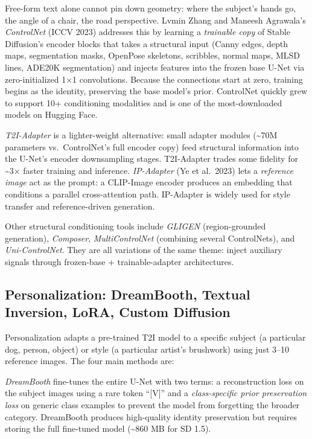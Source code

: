 \documentclass{article}
\begin{document}
Free-form text alone cannot pin down geometry: where the subject's hands go, the angle of a chair, the road perspective. Lvmin Zhang and Maneesh Agrawala's \emph{ControlNet} (ICCV 2023) addresses this by learning a \emph{trainable copy} of Stable Diffusion's encoder blocks that takes a structural input (Canny edges, depth maps, segmentation masks, OpenPose skeletons, scribbles, normal maps, MLSD lines, ADE20K segmentation) and injects features into the frozen base U-Net via zero-initialized 1×1 convolutions. Because the connections start at zero, training begins as the identity, preserving the base model's prior. ControlNet quickly grew to support 10+ conditioning modalities and is one of the most-downloaded models on Hugging Face.

\emph{T2I-Adapter} \citep{mou20242024} is a lighter-weight alternative: small adapter modules (\textasciitilde70M parameters vs.~ControlNet's full encoder copy) feed structural information into the U-Net's encoder downsampling stages. T2I-Adapter trades some fidelity for \textasciitilde3× faster training and inference. \emph{IP-Adapter} (Ye et al.~2023) lets a \emph{reference image} act as the prompt: a CLIP-Image encoder produces an embedding that conditions a parallel cross-attention path. IP-Adapter is widely used for style transfer and reference-driven generation.

Other structural conditioning tools include \emph{GLIGEN} (region-grounded generation), \emph{Composer}, \emph{MultiControlNet} (combining several ControlNets), and \emph{Uni-ControlNet}. They are all variations of the same theme: inject auxiliary signals through frozen-base + trainable-adapter architectures.

\subsection{Personalization: DreamBooth, Textual Inversion, LoRA, Custom Diffusion}\label{personalization-dreambooth-textual-inversion-lora-custom-diffusion}

Personalization adapts a pre-trained T2I model to a specific subject (a particular dog, person, object) or style (a particular artist's brushwork) using just 3--10 reference images. The four main methods are:

\emph{DreamBooth} \citep{ruiz2023dreamboothfinetuni} fine-tunes the entire U-Net with two terms: a reconstruction loss on the subject images using a rare token ``{[}V{]}'' and a \emph{class-specific prior preservation loss} on generic class examples to prevent the model from forgetting the broader category. DreamBooth produces high-quality identity preservation but requires storing the full fine-tuned model (\textasciitilde860 MB for SD 1.5).
\end{document}
